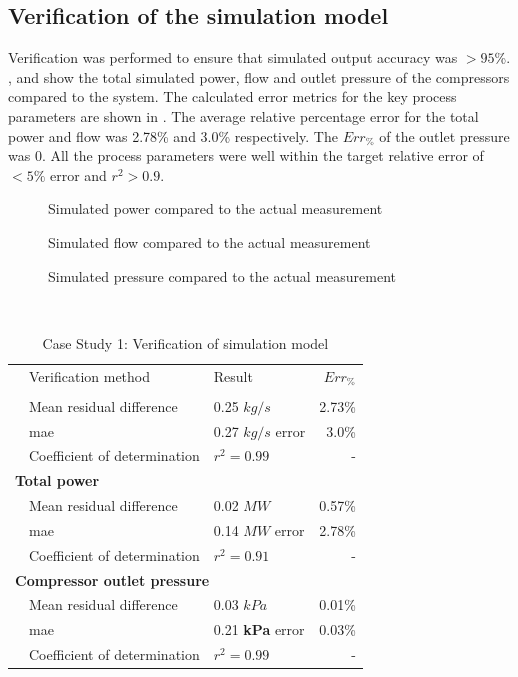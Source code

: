 \subsection{Verification of the simulation model}
Verification was performed to ensure that simulated output accuracy was $>95$\%. ,  and  show the total simulated power, flow and outlet pressure of the compressors compared to the system. The calculated error metrics for the key process parameters are shown in . The average relative percentage error for the total power and flow was 2.78\% and 3.0\% respectively. The $Err_{\%}$ of the outlet pressure was 0. All the process parameters were well within the target relative error of $ <5\% $ error and $r^2 > 0.9$. 
\begin{figure}[h!]
	\centering
	
	\caption{Simulated power compared to the actual measurement}
	\label{fig: Verification power Beatrix}
\end{figure}
\begin{figure}[h!]
	\centering
	
	\caption{Simulated flow compared to the actual measurement}
	\label{fig: Verification flow Beatrix}
\end{figure}
\begin{figure}[h!]
	\centering
	
	\caption{Simulated pressure compared to the actual measurement}
	\label{fig: Verification Pressure Beatrix}
\end{figure}\\
 \begin{table}[h!]
 	\caption{Case Study 1: Verification of simulation model}
	\centering
	\begin{tabular}{p{0.5cm}p{8cm}p{5cm}r}
		\hline
		&Verification method & Result & $Err_{\%}$\\
		\hhline{====}
		\multicolumn{4}{l}{\textbf{ Total Flow}}\\
		&Mean residual difference  & 0.25 $kg/s$ & 2.73\% \\
		&\gls{mae} 					 & 0.27 $kg/s$ error & 3.0\% \\
		&Coefficient of determination & $r^2 =0.99$ & -\\ 
		\multicolumn{4}{l}{\textbf{ Total power}}\\
		&Mean residual difference  & 0.02 $MW$ & 0.57\% \\
		&\gls{mae} 					 & 0.14 $MW$ error & 2.78\% \\
		&Coefficient of determination & $r^2 =0.91$ & -\\ 
		\multicolumn{4}{l}{\textbf{ Compressor outlet pressure}}\\
		&Mean residual difference  &0.03 $kPa$ & 0.01\% \\
		&\gls{mae} 					 & 0.21 \textbf{kPa} error & 0.03\% \\
		&Coefficient of determination & $r^2 =0.99$ & -\\
		\hline
	\end{tabular} 
	\label{Beet verification table}
\end{table}
